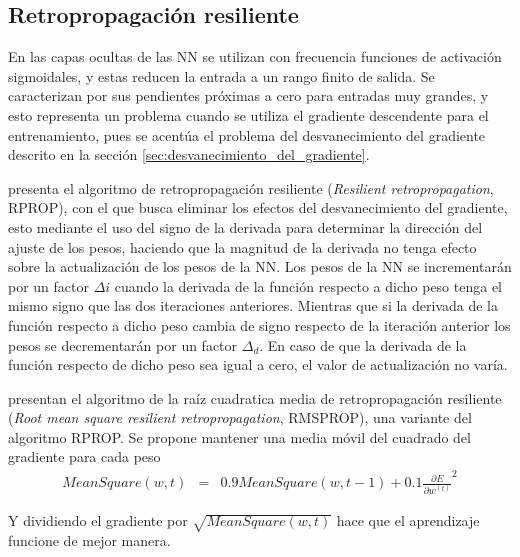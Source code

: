 \subsection{Retropropagación resiliente}
En las capas ocultas de las NN se utilizan con frecuencia funciones de activación sigmoidales, y estas reducen la entrada a un rango finito de salida. Se caracterizan por sus pendientes próximas a cero para entradas muy grandes, y esto representa un problema cuando se utiliza el gradiente descendente para el entrenamiento, pues se acentúa el problema del desvanecimiento del gradiente descrito en la sección \ref{sec:desvanecimiento_del_gradiente}.

 presenta el algoritmo de retropropagación resiliente ({\em Resilient retropropagation}, RPROP), con el que busca eliminar los efectos del desvanecimiento del gradiente, esto mediante el uso del signo de la derivada para determinar la dirección del ajuste de los pesos, haciendo que la magnitud de la derivada no tenga efecto sobre la actualización de los pesos de la NN. Los pesos de la NN se incrementarán por un factor $\Delta{i}$ cuando la derivada de la función respecto a dicho peso tenga el mismo signo que las dos iteraciones anteriores. Mientras que si la derivada de la función respecto a dicho peso cambia de signo respecto de la iteración anterior los pesos se decrementarán por un factor $\Delta_{d}$. En caso de que la derivada de la función respecto de dicho peso sea igual a cero, el valor de actualización no varía.

 presentan el algoritmo de la raíz cuadratica media de retropropagación resiliente ({\em Root mean square resilient retropropagation}, RMSPROP), una variante  del algoritmo RPROP. Se propone mantener una media móvil del cuadrado del gradiente para cada peso
\begin{eqnarray}
	MeanSquare(w, t) &=& 0.9MeanSquare(w, t - 1) + 0.1\frac{\partial E}{\partial w^{(t)}}^{2}
\end{eqnarray}

Y dividiendo el gradiente por $\sqrt{MeanSquare(w, t)}$ hace que el aprendizaje funcione de mejor manera.

